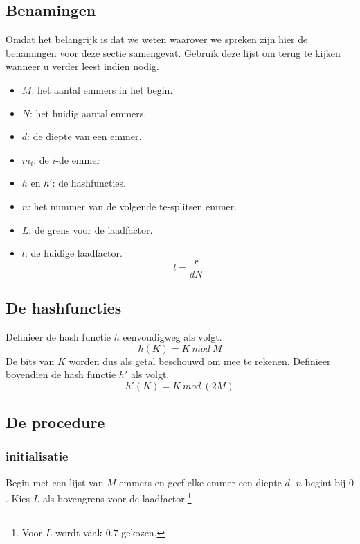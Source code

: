 \documentclass[hashing.tex]{subfiles}
\begin{document}
\subsection{Benamingen}
Omdat het belangrijk is dat we weten waarover we spreken zijn hier de benamingen voor deze sectie samengevat. Gebruik deze lijst om terug te kijken wanneer u verder leest indien nodig.
\begin{itemize}
\item $M$: het aantal emmers in het begin.
\item $N$: het huidig aantal emmers.
\item $d$: de diepte van een emmer.
\item $m_i$: de $i$-de emmer
\item $h$ en $h'$: de hashfuncties.
\item $n$: het nummer van de volgende te-splitsen emmer.
\item $L$: de grens voor de laadfactor.
\item $l$: de huidige laadfactor.
\[
l = \frac{r}{dN}
\]
\end{itemize}

\subsection{De hashfuncties}
Definieer de hash functie $h$ eenvoudigweg als volgt. 
\[
h(K) = K\ mod\ M
\]
De bits van $K$ worden dus als getal beschouwd om mee te rekenen.
Definieer bovendien de hash functie $h'$ als volgt.
\[
h'(K) = K\ mod\ (2M)
\]

\subsection{De procedure}
\subsubsection{initialisatie}
Begin met een lijst van $M$ emmers en geef elke emmer een diepte $d$. $n$ begint bij $0$. Kies $L$ als bovengrens voor de laadfactor.\footnote{Voor $L$ wordt vaak $0.7$ gekozen.}
\end{document}

